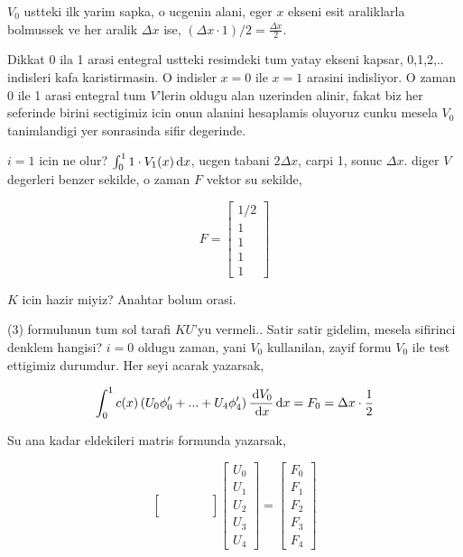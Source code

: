 \documentclass[12pt,fleqn]{article}\usepackage{../../common}
\begin{document}
$V_0$ ustteki ilk yarim sapka, o ucgenin alani, eger $x$ ekseni esit araliklarla
bolmussek ve her aralik $\Delta x$ ise, $(\Delta x \cdot 1) / 2 = \frac{\Delta x}{2}$.

Dikkat 0 ila 1 arasi entegral ustteki resimdeki tum yatay ekseni kapsar,
0,1,2,..  indisleri kafa karistirmasin. O indisler $x=0$ ile $x=1$ arasini
indisliyor. O zaman 0 ile 1 arasi entegral tum $V$'lerin oldugu alan uzerinden
alinir, fakat biz her seferinde birini sectigimiz icin onun alanini hesaplamis
oluyoruz cunku mesela $V_0$ tanimlandigi yer sonrasinda sifir degerinde.

$i=1$ icin ne olur? $\int_{0}^{1} 1 \cdot V_1(x) \,\mathrm{d} x$, ucgen tabani
$2 \Delta x$,  carpi 1, sonuc $\Delta x$. diger $V$ degerleri benzer sekilde,
o zaman $F$ vektor su sekilde,

$$
F = \left[\begin{array}{c}
1/2 \\ 1 \\ 1 \\ 1 \\ 1
\end{array}\right]
$$

$K$ icin hazir miyiz? Anahtar bolum orasi.

(3) formulunun tum sol tarafi $KU$'yu vermeli.. Satir satir gidelim, mesela
sifirinci denklem hangisi? $i=0$ oldugu zaman, yani $V_0$ kullanilan, zayif
formu $V_0$ ile test ettigimiz durumdur. Her seyi acarak yazarsak,

$$
\int _{0}^{1} c(x)
\left( U_0 \phi_0' + ... + U_4 \phi_4'  \right)
\frac{\,\mathrm{d} V_0}{\,\mathrm{d} x} \,\mathrm{d} x = F_0 = \Delta x \cdot \frac{1}{2}
$$

Su ana kadar eldekileri matris formunda yazarsak,

$$
\left[\begin{array}{rrrrr}
 & & & & \\
 & & & & \\
 & & & & \\
 & & & & 
\end{array}\right]
\left[\begin{array}{r}
U_0 \\ U_1 \\ U_2 \\ U_3 \\ U_4
\end{array}\right] =
\left[\begin{array}{r}
F_0 \\ F_1 \\ F_2 \\ F_3 \\ F_4
\end{array}\right]
$$
\end{document}
